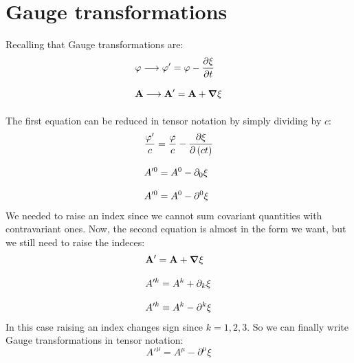 \section{Gauge transformations}
Recalling that Gauge transformations are:
\begin{equation}
  \begin{split}
    &\potE \longrightarrow \potE' = \potE - \pdv{\xi}{t} \\[8pt]
    &\vec{A} \longrightarrow \vec{A}' = \vec{A} + \grad{\xi} \\[8pt]
  \end{split}
\end{equation}
The first equation can be reduced in tensor notation by simply dividing by $c$:
\begin{equation}
  \begin{split}
    &\dfrac{\potE'}{c} = \dfrac{\potE}{c} - \pdv{\xi}{\brackets{ct}}\\[8pt]
    &A'^0 = A^0 - \partial_0\xi \\[8pt]
    &A'^0 = A^0 - \partial^0\xi
  \end{split}
\end{equation}
We needed to raise an index since we cannot sum covariant quantities with contravariant ones. Now, the second equation is almost in the form we want, but we still need to raise the indeces:
\begin{equation}
  \begin{split}
    &\vb{A}' = \vb{A} + \grad{\xi} \\[8pt]
    &A'^k = A^k + \partial_k\xi \\[8pt]
    &A'^k = A^k - \partial^k\xi
  \end{split}
\end{equation}
In this case raising an index changes sign since $k=1,2,3$. So we can finally write Gauge transformations in tensor notation:
\begin{equation}
  A'^{\mu} = A^{\mu} - \partial^{\mu}\xi
\end{equation}
